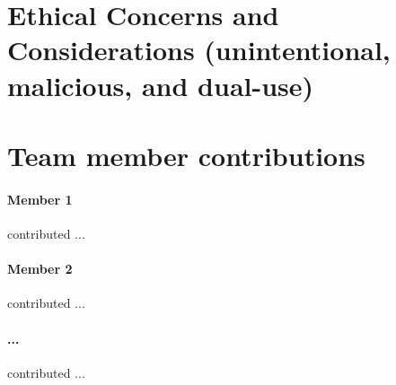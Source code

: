 \documentclass[11pt,a4paper]{article}
\begin{document}
\clearpage
\section{Ethical Concerns and Considerations (unintentional, malicious, and dual-use)}

\clearpage
\section{Team member contributions}
\paragraph{Member 1} contributed ...

\paragraph{Member 2} contributed ...

\paragraph{...} contributed ...





\end{document}
